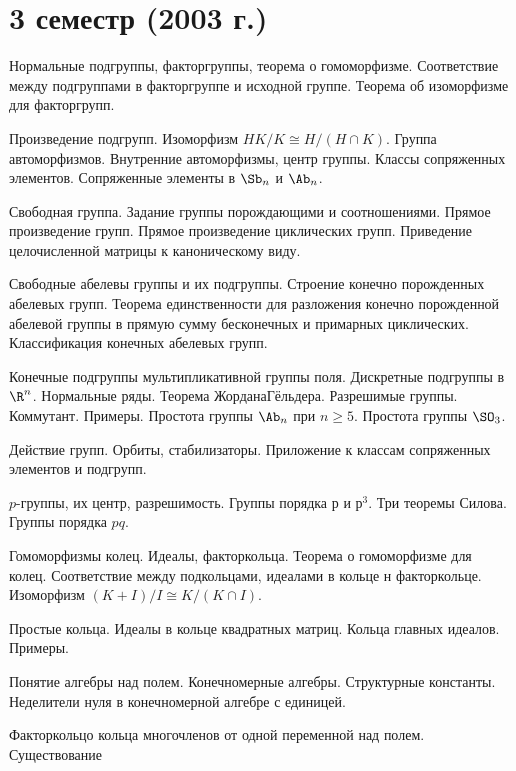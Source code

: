 \documentclass[a4paper]{article}
\begin{document}
\medskip\dmvntrail


\pagebreak

\section*{3 семестр (2003 г.)}

\begin{nums}{-3.5}
\item Нормальные подгруппы, факторгруппы, теорема о гомоморфизме. Соответствие между подгруппами
в факторгруппе и исходной группе. Теорема об изоморфизме для факторгрупп.
\item Произведение подгрупп. Изоморфизм $HK/K \cong H/(H \cap K)$. Группа автоморфизмов. Внутренние автоморфизмы, центр группы.
Классы сопряженных элементов. Сопряженные элементы в $\Sb_n$ и $\Ab_n$.
\item Свободная группа. Задание группы порождающими и соотношениями. Прямое произведение групп.
Прямое произведение циклических групп. Приведение целочисленной матрицы к каноническому виду.
\item Свободные абелевы группы и их подгруппы. Строение конечно порожденных абелевых
групп. Теорема единственности для разложения конечно порожденной  абелевой группы в
прямую сумму бесконечных и примарных циклических. Классификация конечных
абелевых групп.
\item Конечные подгруппы мультипликативной группы поля. Дискретные подгруппы в $\R^n$. Нормальные ряды. Теорема Жордана\ч Гёльдера. Разрешимые группы. Коммутант. Примеры.
Простота группы $\Ab_n$ при $n \ge 5$. Простота группы $\SO_3$.
\item Действие групп. Орбиты, стабилизаторы. Приложение к классам сопряженных элементов
и подгрупп.
\item $p$-группы, их центр, разрешимость. Группы порядка $р$ и $р^3$. Три теоремы Силова. Группы порядка $pq$.
\item Гомоморфизмы колец. Идеалы, факторкольца. Теорема о гомоморфизме для колец.
Соответствие между подкольцами, идеалами в кольце н факторкольце. Изоморфизм
$(K + I)/I \cong K/(K \cap I)$.
\item Простые кольца. Идеалы в кольце квадратных матриц. Кольца главных идеалов. Примеры.
\item Понятие алгебры над полем. Конечномерные алгебры. Структурные константы. Неделители
нуля в конечномерной алгебре с единицей.
\item Факторкольцо кольца многочленов от одной переменной над полем. Существование

\end{nums}
\end{document}
